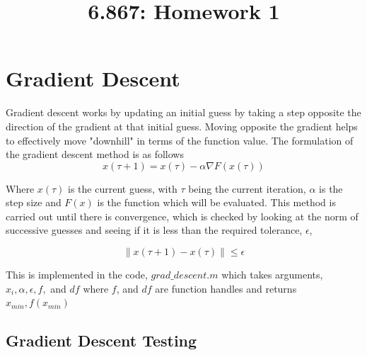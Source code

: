 \documentclass[10pt,twocolumn]{article}
\begin{document}
\title{6.867: Homework 1}

\section{Gradient Descent}
Gradient descent works by updating an initial guess by taking a step opposite the direction of the gradient at that initial guess. Moving opposite the gradient helps  to effectively move "downhill" in terms of the function value.  The formulation of the gradient descent method is as follows
\begin{equation}
x(\tau+1) = x(\tau) - \alpha \nabla F(x(\tau))
\end{equation}

Where $ x(\tau)$ is the current guess, with $\tau$ being the current iteration, $\alpha$ is the step size and $F(x)$ is the function which will be evaluated. This method is carried out until there is convergence, which is checked by looking at the norm of successive guesses and seeing if it is less than the required tolerance, $\epsilon$,   



\begin{equation} 
\left \lVert x(\tau+1)-x(\tau) \right \rVert \leq \epsilon
\end{equation}

This is implemented in the code, $grad\_descent.m$ which takes arguments, $x_i, \alpha, \epsilon, f,$ and $df$ where $f$, and $df$ are function handles and returns $x_{min}, f(x_{min})$



\subsection*{ Gradient Descent Testing}
\end{document}
